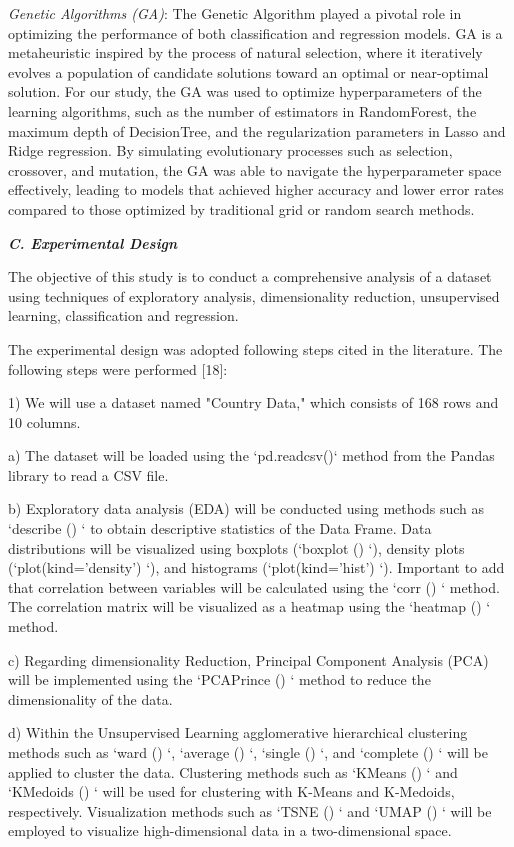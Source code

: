 \documentclass{article}
\begin{document}
\begin{multicols}{2}
\textit{Genetic Algorithms (GA)}: The Genetic Algorithm played a pivotal role in optimizing the performance of both classification and regression models. GA is a metaheuristic inspired by the process of natural selection, where it iteratively evolves a population of candidate solutions toward an optimal or near-optimal solution. For our study, the GA was used to optimize hyperparameters of the learning algorithms, such as the number of estimators in RandomForest, the maximum depth of DecisionTree, and the regularization parameters in Lasso and Ridge regression. By simulating evolutionary processes such as selection, crossover, and mutation, the GA was able to navigate the hyperparameter space effectively, leading to models that achieved higher accuracy and lower error rates compared to those optimized by traditional grid or random search methods.

\textbf{\textit{C. Experimental Design}}

The objective of this study is to conduct a comprehensive analysis of a dataset using techniques of exploratory analysis, dimensionality reduction, unsupervised learning, classification and regression.

The experimental design was adopted following steps cited in the literature. The following steps were performed [18]:

1) We will use a dataset named "Country Data," which consists of 168 rows and 10 columns.

a)	The dataset will be loaded using the `pd.readcsv()` method from the Pandas library to read a CSV file.

b)	Exploratory data analysis (EDA) will be conducted using methods such as `describe () ` to obtain descriptive statistics of the Data Frame. Data distributions will be visualized using boxplots (`boxplot () `), density plots (`plot(kind='density’) `), and histograms (`plot(kind='hist’) `). Important to add that correlation between variables will be calculated using the `corr () ` method. The correlation matrix will be visualized as a heatmap using the `heatmap () ` method.

c) Regarding dimensionality Reduction, Principal Component Analysis (PCA) will be implemented using the `PCAPrince () ` method to reduce the dimensionality of the data.

d) Within the Unsupervised Learning agglomerative hierarchical clustering methods such as `ward () `, `average () `, `single () `, and `complete () ` will be applied to cluster the data. Clustering methods such as `KMeans () ` and `KMedoids () ` will be used for clustering with K-Means and K-Medoids, respectively. Visualization methods such as `TSNE () ` and `UMAP () ` will be employed to visualize high-dimensional data in a two-dimensional space.


\end{multicols}
\end{document}
